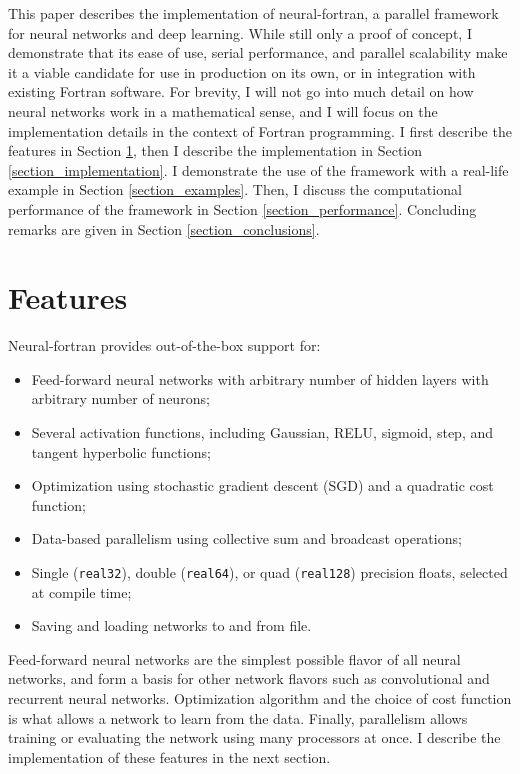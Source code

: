 \documentclass[sigplan, review=false, screen=true, balance=true]{acmart}
\begin{document}
This paper describes the implementation of neural-fortran, a parallel
framework for neural networks and deep learning. While still only a
proof of concept, I demonstrate that its ease of use, serial performance, and
parallel scalability make it a viable candidate for use in production on its
own, or in integration with existing Fortran software. For brevity, I will not
go into much detail on how neural networks work in a mathematical sense, and I
will focus on the implementation details in the context of Fortran programming.
I first describe the features in Section \ref{section_features}, then I describe
the implementation in Section \ref{section_implementation}. I demonstrate the
use of the framework with a real-life example in Section \ref{section_examples}.
Then, I discuss the computational performance of the framework in Section
\ref{section_performance}. Concluding remarks are given in Section
\ref{section_conclusions}.

\section{Features} \label{section_features}

Neural-fortran provides out-of-the-box support for:

\begin{itemize}
  \item Feed-forward neural networks with arbitrary number of hidden layers with
  arbitrary number of neurons;
  \item Several activation functions, including Gaussian, RELU, sigmoid, step,
  and tangent hyperbolic functions;
  \item Optimization using stochastic gradient descent (SGD) \citep{rumelhart86}
  and a quadratic cost function;
  \item Data-based parallelism using collective sum and broadcast operations;
  \item Single (\lstinline{real32}), double (\lstinline{real64}), or quad
  (\lstinline{real128}) precision floats, selected at compile time;
  \item Saving and loading networks to and from file.
\end{itemize}

Feed-forward neural networks are the simplest possible flavor of all neural
networks, and form a basis for other network flavors such as convolutional
\citep{krizhevsky12} and recurrent \citep{hochreiter97} neural networks.
Optimization algorithm and the choice of cost function is what allows a network
to learn from the data. Finally, parallelism allows training or evaluating the
network using many processors at once. I describe the implementation of these
features in the next section.
\end{document}
